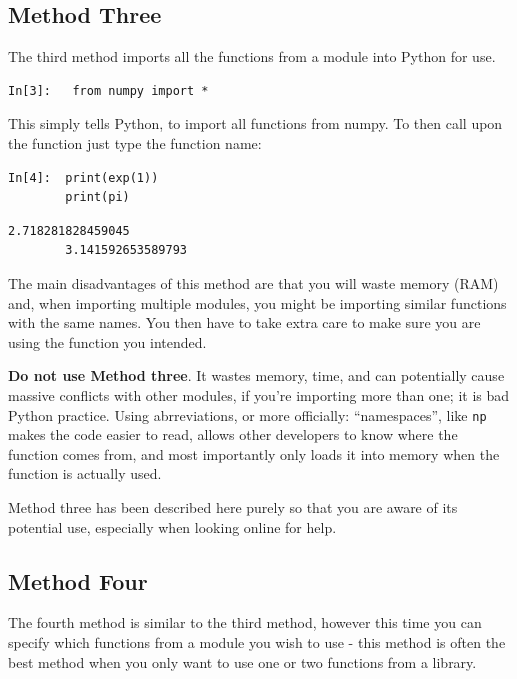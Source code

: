 \subsection{Method Three}
The third method imports all the functions from a module into Python for use.
\begin{lstlisting}[style=PY]
In[3]:   from numpy import *
\end{lstlisting}
This simply tells Python, to import all functions from numpy. To then call upon the function just type the function name:
\begin{lstlisting}[style=PY]
In[4]:  print(exp(1))
        print(pi)
\end{lstlisting}
\begin{lstlisting}[style=PY_out]
        2.718281828459045
        3.141592653589793
\end{lstlisting}
The main disadvantages of this method are that you will waste memory (RAM) and, when importing multiple modules, you might be importing similar functions with the same names. You then have to take extra care to make sure you are using the function you intended.
\vspace{0.25cm}
\begin{tcolorbox}[colback=red!5!white,colframe=red!75!black]
\textbf{Do not use Method three}. It wastes memory, time, and can potentially cause massive conflicts with other modules, if you're importing more than one; it is bad Python practice. Using abrreviations, or more officially: ``namespaces'', like \texttt{np} makes the code easier to read, allows other developers to know where the function comes from, and most importantly only loads it into memory when the function is actually used.
\vspace{0.25cm}

Method three has been described here purely so that you are aware of its potential use, especially when looking online for help. 
\end{tcolorbox}

\subsection{Method Four}
The fourth method is similar to the third method, however this time you can specify which functions from a module you wish to use - this method is often the best method when you only want to use one or two functions from a library.

